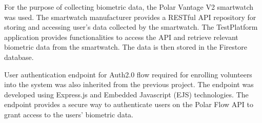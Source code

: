 For the purpose of collecting biometric data, the Polar Vantage V2 smartwatch was used. The smartwatch manufacturer provides a RESTful API
repository for storing and accessing user's data collected by the smartwatch. The TestPlatform application provides functionalities to 
access the API and retrieve relevant biometric data from the smartwatch. The data is then stored in the Firestore database.

User authentication endpoint for Auth2.0 flow required for enrolling volunteers into the system was also inherited from the previous project. 
The endpoint was developed using Express.js and Embedded Javascript (EJS) technologies. The endpoint provides a secure way to authenticate
users on the Polar Flow API to grant access to the users' biometric data. 
